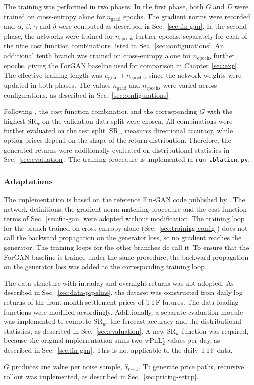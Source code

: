 The training was performed in two phases. In the first phase, both $G$ and $D$ were trained on cross-entropy alone for $n_{\text{grad}}$ epochs. The gradient norms were recorded and $\alpha$, $\beta$, $\gamma$ and $\delta$ were computed as described in Sec.~\ref{sec:fin-gan}. In the second phase, the networks were trained for $n_{\text{epochs}}$ further epochs, separately for each of the nine cost function combinations listed in Sec.~\ref{sec:configurations}. An additional tenth branch was trained on cross-entropy alone for $n_{\text{epochs}}$ further epochs, giving the ForGAN baseline used for comparison in Chapter~\ref{sec:exp}. The effective training length was $n_{\text{grad}} + n_{\text{epochs}}$, since the network weights were updated in both phases. The values $n_{\text{grad}}$ and $n_{\text{epochs}}$ were varied across configurations, as described in Sec.~\ref{sec:configurations}.

Following \textcite{vuleticFinGANForecastingClassifying2024}, the cost function combination and the corresponding $G$ with the highest $\mathrm{SR}_{w}$ on the validation data split were chosen. All combinations were further evaluated on the test split. $\mathrm{SR}_{w}$ measures directional accuracy, while option prices depend on the shape of the return distribution. Therefore, the generated returns were additionally evaluated on distributional statistics in Sec.~\ref{sec:evaluation}. The training procedure is implemented in \texttt{run\_ablation.py}.


\subsubsection{Adaptations}\label{sec:adaptations}
The implementation is based on the reference Fin-GAN code published by \textcite{vuleticFinGANForecastingClassifying2024}. The network definitions, the gradient norm matching procedure and the cost function terms of Sec.~\ref{sec:fin-gan} were adopted without
modification. The training loop for the branch trained on cross-entropy alone (Sec.~\ref{sec:training-config}) does not call the backward propagation on the generator loss, so no gradient reaches the generator. The training loops for the other branches do call it. To ensure that the ForGAN baseline is trained under the same procedure, the backward propagation on the generator loss was added to the corresponding training loop.

The data structure with intraday and overnight returns was not adopted. As described in Sec.~\ref{sec:data-pipeline}, the dataset was constructed from daily log returns of the front-month settlement prices of TTF futures. The data loading functions were modified accordingly. Additionally, a separate evaluation module was implemented to compute $\mathrm{SR}_{w}$, the forecast accuracy and the distributional statistics, as described in Sec.~\ref{sec:evaluation}. A new $\mathrm{SR}_{w}$ function was required, because the original implementation sums two $\mathrm{wPnL}^{i}_{2}$ values per day, as described in Sec.~\ref{sec:fin-gan}. This is not applicable to the daily TTF data.

$G$ produces one value per noise sample, $\hat{x}_{t+1}$. To generate price paths, recursive rollout was implemented, as described in Sec.~\ref{sec:pricing-setup}.
